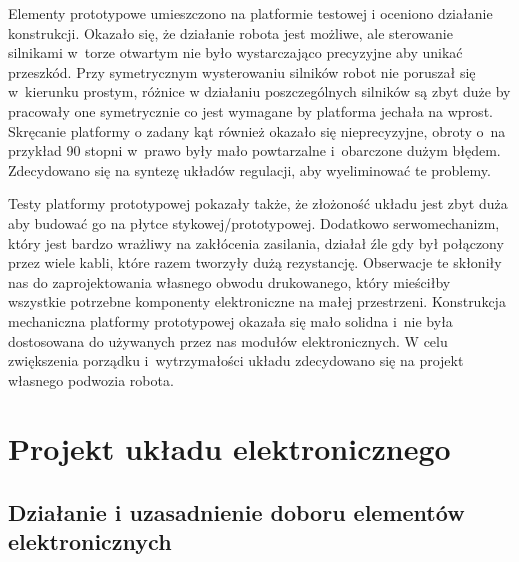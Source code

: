 \documentclass[11pt]{article}
\begin{document}
Elementy prototypowe umieszczono na platformie testowej i oceniono działanie konstrukcji.
Okazało się, że działanie robota jest możliwe, ale sterowanie silnikami w~torze otwartym nie było wystarczająco precyzyjne aby unikać przeszkód. Przy symetrycznym wysterowaniu silników robot nie poruszał się w~kierunku prostym, różnice w działaniu poszczególnych silników są zbyt duże by pracowały one symetrycznie co jest wymagane by platforma jechała na wprost.
Skręcanie platformy o zadany kąt również okazało się nieprecyzyjne, obroty o~na przykład 90 stopni w~prawo były mało powtarzalne i~obarczone dużym błędem. Zdecydowano się na syntezę układów regulacji, aby wyeliminować te problemy.

Testy platformy prototypowej pokazały także, że złożoność układu jest zbyt duża aby budować go na płytce stykowej/prototypowej.
Dodatkowo serwomechanizm, który jest bardzo wrażliwy na zakłócenia zasilania, działał źle gdy był połączony przez wiele kabli, które razem tworzyły dużą rezystancję. Obserwacje te skłoniły nas do zaprojektowania własnego obwodu drukowanego, który mieściłby wszystkie potrzebne komponenty elektroniczne na małej przestrzeni.
Konstrukcja mechaniczna platformy prototypowej okazała się mało solidna i~nie była dostosowana do używanych przez nas modułów elektronicznych. W celu zwiększenia porządku i~wytrzymałości układu zdecydowano się na projekt własnego podwozia robota.

\section{Projekt układu elektronicznego}
\subsection{Działanie i uzasadnienie doboru elementów elektronicznych}
\end{document}
